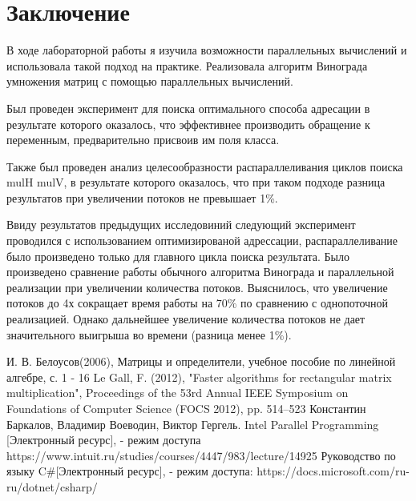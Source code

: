\documentclass[12pt]{report}
\begin{document}
\chapter*{Заключение}
В ходе лабораторной работы я изучила возможности параллельных вычислений и использовала такой подход на практике. Реализовала алгоритм Винограда умножения матриц с помощью параллельных вычислений.

Был проведен эксперимент для поиска оптимального способа адресации в результате которого оказалось, что эффективнее производить обращение к переменным, предварительно присвоив им поля класса.

Также был проведен анализ целесообразности распараллеливания циклов поиска mulH mulV, в результате которого оказалось, что при таком подходе разница результатов при увеличении потоков не превышает 1\%. 

Ввиду результатов предыдущих исследовиний следующий эксперимент проводился с использованием оптимизированой адрессации, распараллеливание было произведено только для главного цикла поиска результата.
Было произведено сравнение работы обычного алгоритма Винограда и параллельной реализации при увеличении количества потоков. Выяснилось, что увеличение потоков до 4х сокращает время работы на 70\% по сравнению с
однопоточной реализацией. Однако дальнейшее увеличение количества потоков не дает значительного выигрыша во времени (разница менее 1\%). 
 \begin{thebibliography}{3}
И. В. Белоусов(2006), Матрицы и определители, учебное пособие по линейной алгебре, с. 1 - 16
Le Gall, F. (2012), "Faster algorithms for rectangular matrix multiplication", Proceedings of the 53rd Annual IEEE Symposium on Foundations of Computer Science (FOCS 2012), pp. 514–523
Константин Баркалов, Владимир Воеводин, Виктор Гергель. Intel Parallel Programming [Электронный ресурс], - режим доступа https://www.intuit.ru/studies/courses/4447/983/lecture/14925
Руководство по языку C\#[Электронный ресурс], - режим доступа: https://docs.microsoft.com/ru-ru/dotnet/csharp/
\end{thebibliography}
\end{document}
